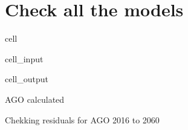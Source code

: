 \documentclass[letterpaper,10pt,english]{jupyterBook}
\begin{document}
\section{Check all the models}
\label{\detokenize{content/howto/onboard/eviews/onboard many models from wf1:check-all-the-models}}
\begin{sphinxuseclass}{cell}\begin{sphinxVerbatimInput}

\begin{sphinxuseclass}{cell_input}
\begin{sphinxVerbatim}[commandchars=\\\{\}]
   
       
\end{sphinxVerbatim}

\end{sphinxuseclass}\end{sphinxVerbatimInput}
\begin{sphinxVerbatimOutput}

\begin{sphinxuseclass}{cell_output}
\begin{sphinxVerbatim}[commandchars=\\\{\}]
AGO calculated  

Chekking residuals for AGO 2016 to 2060


\end{sphinxVerbatim}
\end{sphinxuseclass}
\end{sphinxVerbatimOutput}
\end{sphinxuseclass}
\end{document}
